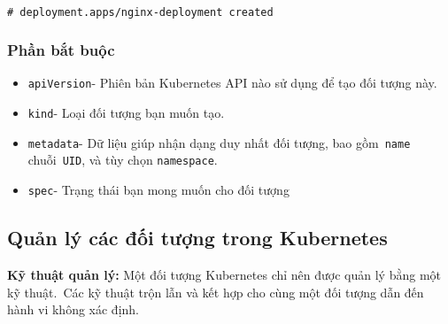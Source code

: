 \documentclass[12pt,a4paper]{report}
\newcommand{\shellcmd}[1]{\\\indent\indent\texttt{\footnotesize\# #1}\\}
\begin{document}
	\hspace{0.3cm}{Đầu ra tương tự như thế này:\\}
	\shellcmd{deployment.apps/nginx-deployment created}
	
	\subsubsection{Phần bắt buộc}
	\hspace{1cm}{Trong tệp .yaml dành cho đối tượng Kubernetes muốn tạo, sẽ cần đặt giá trị cho các trường sau:}
	\begin{itemize}
		\item \texttt{apiVersion}- Phiên bản Kubernetes API nào sử dụng để tạo đối tượng này.
		\item \texttt{kind}- Loại đối tượng bạn muốn tạo.
		\item \texttt{metadata}- Dữ liệu giúp nhận dạng duy nhất đối tượng, bao gồm \texttt{name} chuỗi \texttt{UID}, và tùy chọn \texttt{namespace}.
		\item \texttt{spec}- Trạng thái bạn mong muốn cho đối tượng
	\end{itemize}

	
	\subsection{Quản lý các đối tượng trong Kubernetes}
	
	
	\textbf{Kỹ thuật quản lý:} 
	Một đối tượng Kubernetes chỉ nên được quản lý bằng một kỹ thuật. Các kỹ thuật trộn lẫn và kết hợp cho cùng một đối tượng dẫn đến hành vi không xác định.
	
\end{document}

